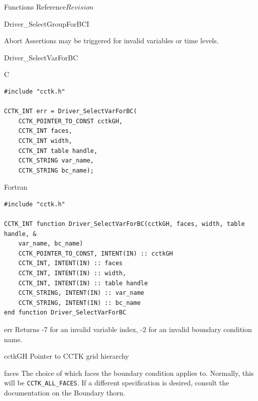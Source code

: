 \begin{cactuspart}{ Functions Reference}{}{$Revision$}
\begin{FunctionDescription}{Driver\_SelectGroupForBCI}
\begin{ErrorSection}
\begin{Error}{Abort}
Assertions may be triggered for invalid variables or time levels.
\end{Error}
\end{ErrorSection}
\end{FunctionDescription}

\begin{FunctionDescription}{Driver\_SelectVarForBC}
\label{Driver-SelectVarForBC}
\begin{SynopsisSection}
\begin{Synopsis}{C}
\begin{verbatim}
#include "cctk.h"

CCTK_INT err = Driver_SelectVarForBC(
    CCTK_POINTER_TO_CONST cctkGH,
    CCTK_INT faces,
    CCTK_INT width,
    CCTK_INT table handle,
    CCTK_STRING var_name,
    CCTK_STRING bc_name);

\end{verbatim}
\end{Synopsis}
\begin{Synopsis}{Fortran}
\begin{verbatim}
#include "cctk.h"

CCTK_INT function Driver_SelectVarForBC(cctkGH, faces, width, table handle, &
    var_name, bc_name)
    CCTK_POINTER_TO_CONST, INTENT(IN) :: cctkGH
    CCTK_INT, INTENT(IN) :: faces
    CCTK_INT, INTENT(IN) :: width,
    CCTK_INT, INTENT(IN) :: table handle
    CCTK_STRING, INTENT(IN) :: var_name
    CCTK_STRING, INTENT(IN) :: bc_name
end function Driver_SelectVarForBC
\end{verbatim}
\end{Synopsis}
\end{SynopsisSection}

\begin{ResultSection}
\begin{Result}{err}
Returns -7 for an invalid variable index, -2 for an invalid boundary condition name.
\end{Result}
\end{ResultSection}

\begin{ParameterSection}
\begin{Parameter}{cctkGH}
Pointer to CCTK grid hierarchy
\end{Parameter}

\begin{Parameter}{faces}
The choice of which faces the boundary condition applies to.
Normally, this will be \texttt{CCTK\_ALL\_FACES}. If a different
specification is desired, consult the documentation on the
Boundary thorn.
\end{Parameter}


\end{ParameterSection}
\end{FunctionDescription}
\end{cactuspart}
